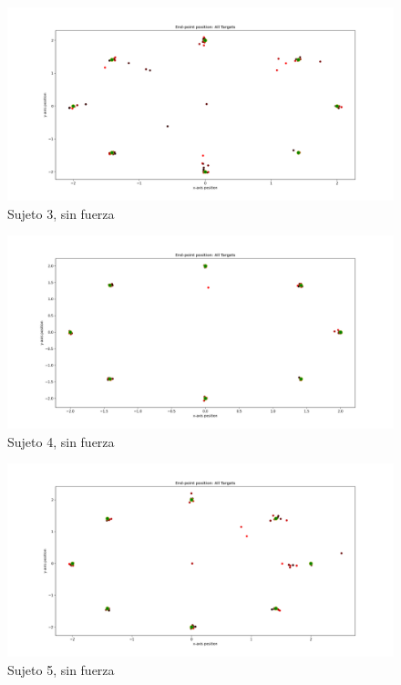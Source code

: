 \documentclass[a4paper,11pt, oneside]{book}
\begin{document}
\begin{figure}[H]
	\centering
	\includegraphics[width=\linewidth]{sujeto3/no_force/trayectorias_puntos}
	\caption{Sujeto 3, sin fuerza}
	\label{3-1-1}
\end{figure}
\begin{figure}[H]
	\centering
	\includegraphics[width=\linewidth]{sujeto4/no_force/trayectorias_puntos}
	\caption{Sujeto 4, sin fuerza}
	\label{4-1-1}
\end{figure}
\begin{figure}[H]
	\centering
	\includegraphics[width=\linewidth]{sujeto5/no_force/trayectorias_puntos}
	\caption{Sujeto 5, sin fuerza}
	\label{5-1-1}
\end{figure}
\end{document}
